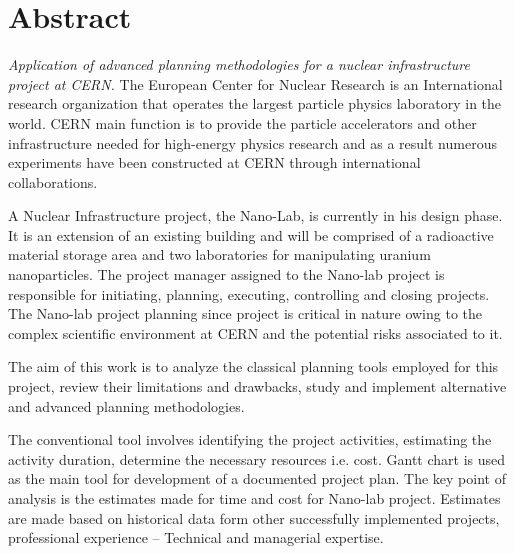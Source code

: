 %
%
%

\chapter*{\huge Abstract}
\begin{SingleSpace}
\emph{Application of advanced planning methodologies for a nuclear infrastructure project at CERN. }
\bigskip
The European Center for Nuclear Research is an International research organization that operates the largest particle physics laboratory in the world. CERN main function is to provide the particle accelerators and other infrastructure needed for high-energy physics research and as a result numerous experiments have been constructed at CERN through international collaborations.

 A Nuclear Infrastructure project, the Nano-Lab, is currently in his design phase. It is an extension of an existing building and will be comprised of a radioactive material storage area and two laboratories for manipulating uranium nanoparticles. The project manager assigned to the Nano-lab project is responsible for initiating, planning, executing, controlling and closing projects. The Nano-lab project planning since project is critical in nature owing to the complex scientific environment at CERN and the potential risks associated to it. 

The aim of this work is to analyze the classical planning tools employed for this project, review their limitations and drawbacks, study and implement alternative and advanced planning methodologies. 

The conventional tool involves identifying the project activities, estimating the activity duration, determine the necessary resources i.e. cost. Gantt chart is used as the main tool for development of a documented project plan. The key point of analysis is the estimates made for time and cost for Nano-lab project. Estimates are made based on historical data form other successfully implemented projects, professional experience – Technical and managerial expertise. 


\end{SingleSpace}
